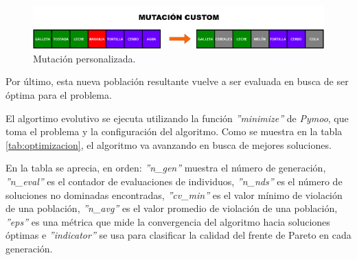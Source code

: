 \begin{figure}[H]
    \centering
    \includegraphics[width=1\textwidth]{figures/mutacion-custom.png}
    \caption{Mutación personalizada.}
    \label{fig:mutacion-custom}
\end{figure}

Por último, esta nueva población resultante vuelve a ser evaluada en busca de ser óptima para el problema.

El algortimo evolutivo se ejecuta utilizando la función \textit{''minimize''} de \textit{Pymoo}, que toma el problema y la configuración del algoritmo. Como se muestra en la tabla \ref{tab:optimizacion}, el algoritmo va avanzando en busca de mejores soluciones.

En la tabla se aprecia, en orden: \textit{''n\_gen''} muestra el número de generación, \textit{''n\_eval''} es el contador de evaluaciones de individuos, \textit{''n\_nds''} es el número de soluciones no dominadas encontradas, \textit{''cv\_min''} es el valor mínimo de violación de una población, \textit{''n\_avg''} es el valor promedio de violación de una población, \textit{''eps''} es una métrica que mide la convergencia del algoritmo hacia soluciones óptimas e \textit{''indicator''} se usa para clasificar la calidad del frente de Pareto en cada generación.

